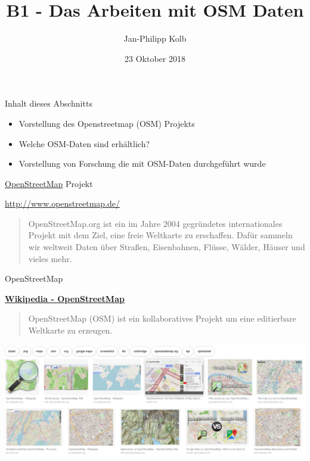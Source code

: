 \documentclass[ignorenonframetext,]{beamer}
\title{B1 - Das Arbeiten mit OSM Daten}
\author{Jan-Philipp Kolb}
\date{23 Oktober 2018}
\providecommand{\tightlist}{%
  \setlength{\itemsep}{0pt}\setlength{\parskip}{0pt}}
\begin{document}
\frame{\titlepage}

\begin{frame}{Inhalt dieses Abschnitts}
\protect\hypertarget{inhalt-dieses-abschnitts}{}

\begin{itemize}
\tightlist
\item
  Vorstellung des Openstreetmap (OSM) Projekts
\item
  Welche OSM-Daten sind erhältlich?
\item
  Vorstellung von Forschung die mit OSM-Daten durchgeführt wurde
\end{itemize}

\end{frame}

\begin{frame}{\href{http://www.openstreetmap.de/}{OpenStreetMap}
Projekt}
\protect\hypertarget{openstreetmap-projekt}{}

\begin{block}{\url{http://www.openstreetmap.de/}}

\begin{quote}
OpenStreetMap.org ist ein im Jahre 2004 gegründetes internationales
Projekt mit dem Ziel, eine freie Weltkarte zu erschaffen. Dafür sammeln
wir weltweit Daten über Straßen, Eisenbahnen, Flüsse, Wälder, Häuser und
vieles mehr.
\end{quote}

\end{block}

\end{frame}

\begin{frame}{OpenStreetMap}
\protect\hypertarget{openstreetmap}{}

\begin{block}{\href{https://en.wikipedia.org/wiki/OpenStreetMap}{\textbf{Wikipedia
- OpenStreetMap}}}

\begin{quote}
OpenStreetMap (OSM) ist ein kollaboratives Projekt um eine editierbare
Weltkarte zu erzeugen.
\end{quote}

\includegraphics{figure/overview_osm.PNG}

\end{block}

\end{frame}
\end{document}
